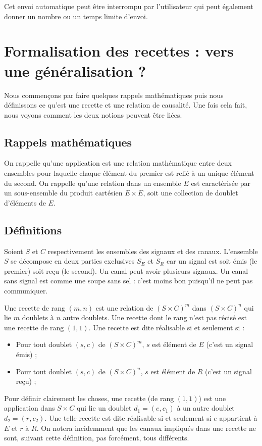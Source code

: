 \documentclass[11pt]{article}
\begin{document}
Cet envoi automatique peut être interrompu par l'utilisateur qui peut également donner un nombre ou un temps limite d'envoi.

\section{Formalisation des recettes : vers une généralisation ?}

Nous commençons par faire quelques rappels mathématiques puis nous définissons ce qu'est une recette et une relation de causalité. Une fois cela fait, nous voyons comment les deux notions peuvent être liées.

\subsection{Rappels mathématiques}

On rappelle qu'une application est une relation mathématique entre deux ensembles pour laquelle chaque élément du premier est relié à un unique élément du second. On rappelle qu'une relation dans un ensemble $E$ est caractérisée par un sous-ensemble du produit cartésien $E \times E$, soit une collection de doublet d'éléments de $E$.

\subsection{Définitions}

Soient $S$ et $C$ respectivement les ensembles des signaux et des canaux. L'ensemble $S$ se décompose en deux parties exclusives $S_E$ et $S_R$ car un signal est soit émis (le premier) soit reçu (le second). Un canal peut avoir plusieurs signaux. Un canal sans signal est comme une soupe sans sel : c'est moins bon puisqu'il ne peut pas communiquer.

Une recette de rang $(m, n)$ est une relation de $\left(S\times C\right)^m$ dans $\left(S\times C\right)^n$ qui lie $m$ doublets à $n$ autre doublets. Une recette dont le rang n'est pas récisé est une recette de rang $(1, 1)$. Une recette est dite réalisable si et seulement si :
\begin{itemize}
\item Pour tout doublet $(s, c)$ de $\left(S\times C\right)^m$, $s$ est élément de $E$ (c'est un signal émis) ;
\item Pour tout doublet $(s, c)$ de $\left(S\times C\right)^n$, $s$ est élément de $R$ (c'est un signal reçu) ;
\end{itemize}
Pour définir clairement les choses, une recette (de rang $(1, 1)$) est une application dans $S\times C$ qui lie un doublet $d_1 = (e, c_1)$ à un autre doublet $d_2 = (r, c_2)$. Une telle recette est dite réalisable si et seulement si $e$ appartient à $E$ et $r$ à $R$. On notera incidemment que les canaux impliqués dans une recette ne sont, suivant cette définition, pas forcément, tous différents.
\end{document}
